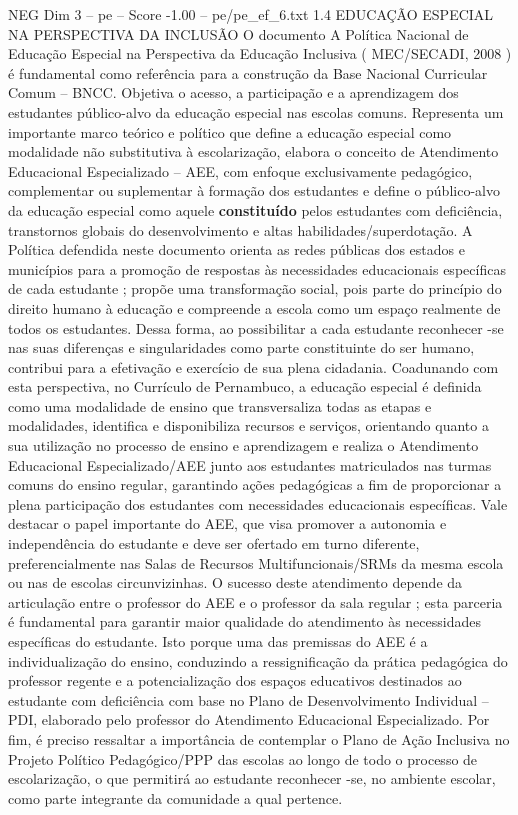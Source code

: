 \begin{textsample}{NEG Dim 3 – pe – Score -1.00 – pe/pe\_ef\_6.txt}  \label{ex:f3_neg_001}
1.4 EDUCAÇÃO ESPECIAL NA PERSPECTIVA DA INCLUSÃO O documento A Política Nacional de Educação Especial na Perspectiva da Educação Inclusiva ( MEC/SECADI, 2008 ) é fundamental como referência para a construção da Base Nacional Curricular Comum – BNCC.
Objetiva o acesso, a participação e a aprendizagem dos estudantes público-alvo da educação especial nas escolas comuns.
Representa um importante marco teórico e político que define a educação especial como modalidade não substitutiva à escolarização, elabora o conceito de Atendimento Educacional Especializado – AEE, com enfoque exclusivamente pedagógico, complementar ou suplementar à formação dos estudantes e define o público-alvo da educação especial como aquele \textbf{constituído} pelos estudantes com deficiência, transtornos globais do desenvolvimento e altas habilidades/superdotação.
A Política defendida neste documento orienta as redes públicas dos estados e municípios para a promoção de respostas às necessidades educacionais específicas de cada estudante ; propõe uma transformação social, pois parte do princípio do direito humano à educação e compreende a escola como um espaço realmente de todos os estudantes.
Dessa forma, ao possibilitar a cada estudante reconhecer -se nas suas diferenças e singularidades como parte constituinte do ser humano, contribui para a efetivação e exercício de sua plena cidadania.
Coadunando com esta perspectiva, no Currículo de Pernambuco, a educação especial é definida como uma modalidade de ensino que transversaliza todas as etapas e modalidades, identifica e disponibiliza recursos e serviços, orientando quanto a sua utilização no processo de ensino e aprendizagem e realiza o Atendimento Educacional Especializado/AEE junto aos estudantes matriculados nas turmas comuns do ensino regular, garantindo ações pedagógicas a fim de proporcionar a plena participação dos estudantes com necessidades educacionais específicas.
Vale destacar o papel importante do AEE, que visa promover a autonomia e independência do estudante e deve ser ofertado em turno diferente, preferencialmente nas Salas de Recursos Multifuncionais/SRMs da mesma escola ou nas de escolas circunvizinhas.
O sucesso deste atendimento depende da articulação entre o professor do AEE e o professor da sala regular ; esta parceria é fundamental para garantir maior qualidade do atendimento às necessidades específicas do estudante.
Isto porque uma das premissas do AEE é a individualização do ensino, conduzindo a ressignificação da prática pedagógica do professor regente e a potencialização dos espaços educativos destinados ao estudante com deficiência com base no Plano de Desenvolvimento Individual – PDI, elaborado pelo professor do Atendimento Educacional Especializado.
Por fim, é preciso ressaltar a importância de contemplar o Plano de Ação Inclusiva no Projeto Político Pedagógico/PPP das escolas ao longo de todo o processo de escolarização, o que permitirá ao estudante reconhecer -se, no ambiente escolar, como parte integrante da comunidade a qual pertence.

\end{textsample}
